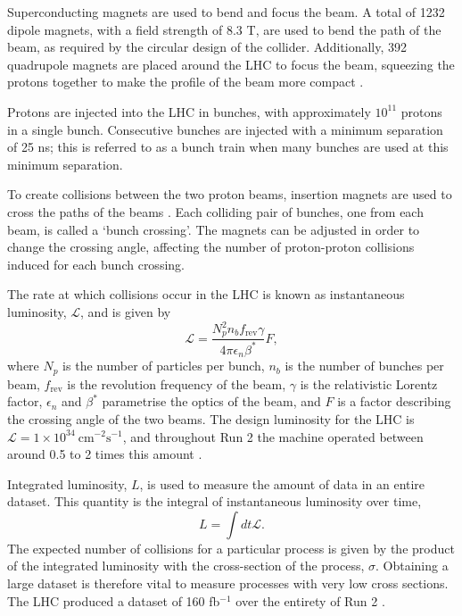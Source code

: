Superconducting magnets are used to bend and focus the beam. A total of
1232 dipole magnets, with a field strength of 8.3 T, are used to
bend the path of the beam, as required by the circular design of the collider.
Additionally, 392 quadrupole magnets are placed around the \ac{LHC} to focus the
beam, squeezing the protons together to make the profile of the beam more
compact \cite{LHCVol1}.

Protons are injected into the \ac{LHC} in bunches, with approximately $10^{11}$
protons in a single bunch. Consecutive bunches are injected with a minimum
separation of 25 ns; this is referred to as a bunch train when many bunches are
used at this minimum separation.

To create collisions between the two proton beams, insertion magnets are used to
cross the paths of the beams \cite{Ostojic2002}. Each colliding pair of bunches,
one from each beam, is called a `bunch crossing'. The magnets can be adjusted in
order to change the crossing angle, affecting the number of proton-proton
collisions induced for each bunch crossing.

The rate at which collisions occur in the \ac{LHC} is known as instantaneous
luminosity, $\mathcal{L}$, and is given by
\begin{equation*}
  \mathcal{L} = \frac{ N_p^2 n_b f_\text{rev} \gamma }
  { 4 \pi \epsilon_n \beta^*} F,
\end{equation*}
%
where $N_p$ is the number of particles per bunch, $n_b$ is the number of bunches
per beam, $f_\text{rev}$ is the revolution frequency of the beam, $\gamma$ is
the relativistic Lorentz factor, $\epsilon_n$ and $\beta^*$ parametrise the
optics of the beam, and $F$ is a factor describing the crossing angle of the two
beams. The design luminosity for the \ac{LHC} is $\mathcal{L} =
1\times10^{34}~\text{cm}^{-2}\text{s}^{-1}$, and throughout Run 2 the machine
operated between around 0.5 to 2 times this amount \cite{Steerenberg2019}.

Integrated luminosity, $L$, is used to measure the amount of data in an entire
dataset. This quantity is the integral of instantaneous luminosity over time,
\begin{equation*}
  L = \int dt \mathcal{L}.
\end{equation*}
The expected number of collisions for a particular process is given by the
product of the integrated luminosity with the cross-section of the process,
$\sigma$. Obtaining a large dataset is therefore vital to measure processes with
very low cross sections. The \ac{LHC} produced a dataset of 160 fb$^{-1}$ over
the entirety of Run 2 \cite{Steerenberg2019}.

